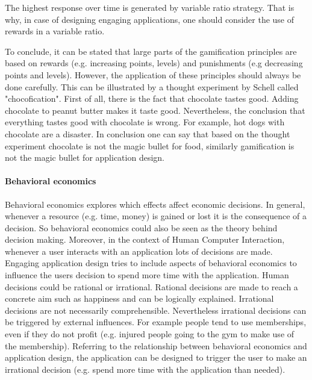 The highest response over time is generated by variable ratio strategy. That is why, in case of designing engaging applications, one should consider the use of rewards in a variable ratio. \cite[p. 11]{lewisIrresistibleAppsMotivational2014}

To conclude, it can be stated that large parts of the gamification principles are based on rewards (e.g. increasing points, levels) and punishments (e.g decreasing points and levels). However, the application of these principles should always be done carefully. This can be illustrated by a thought experiment by Schell called "chocofication". First of all, there is the fact that chocolate tastes good. Adding chocolate to peanut butter makes it taste good. Nevertheless, the conclusion that everything tastes good with chocolate is wrong. For example, hot dogs with chocolate are a disaster. 
In conclusion one can say that based on the thought experiment chocolate is not the magic bullet for food, similarly gamification is not the magic bullet for application design. \cite[p. 12]{lewisIrresistibleAppsMotivational2014}


\paragraph*{Behavioral economics}

Behavioral economics explores which effects affect economic decisions. In general, whenever a resource (e.g. time, money) is gained or lost it is the consequence of a decision. So behavioral economics could also be seen as the theory behind decision making. Moreover, in the context of Human Computer Interaction, whenever a user interacts with an application lots of decisions are made. Engaging application design tries to include aspects of behavioral economics to influence the users decision to spend more time with the application. 
Human decisions could be rational or irrational. Rational decisions are made to reach a concrete aim such as happiness and can be logically explained. Irrational decisions are not necessarily comprehensible. Nevertheless irrational decisions can be triggered by external influences. For example people tend to use memberships, even if they do not profit (e.g. injured people going to the gym to make use of the membership).
Referring to the relationship between behavioral economics and application design, the application can be designed to trigger the user to make an irrational decision (e.g. spend more time with the application than needed). \cite[p. 19]{lewisIrresistibleAppsMotivational2014}


